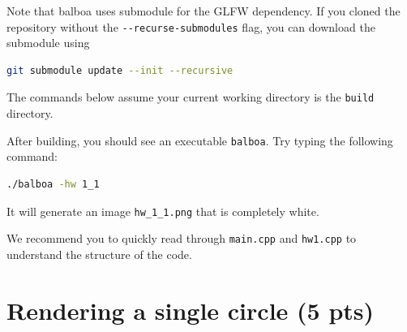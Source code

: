 Note that balboa uses submodule for the GLFW dependency. If you cloned the repository without the \lstinline{--recurse-submodules} flag, you can download the submodule using
\begin{lstlisting}[language=bash]
git submodule update --init --recursive
\end{lstlisting}

The commands below assume your current working directory is the \lstinline{build} directory.

After building, you should see an executable \lstinline{balboa}. Try typing the following command:
\begin{lstlisting}[language=bash]
  ./balboa -hw 1_1
\end{lstlisting}
It will generate an image \lstinline{hw_1_1.png} that is completely white.

We recommend you to quickly read through \lstinline{main.cpp} and \lstinline{hw1.cpp} to understand the structure of the code.

\section{Rendering a single circle (5 pts)}

